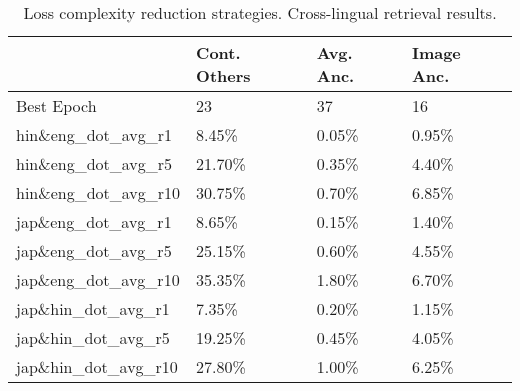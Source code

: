 \begin{table}
    \centering
\begin{tabular}{llll}
\toprule
{} & Cont. Others & Avg. Anc. & Image Anc. \\
\midrule
Best Epoch          &                            23 &                   37 &                           16 \\
\midrule
hin\&eng\_dot\_avg\_r1  &                         8.45\% &                0.05\% &                        0.95\% \\
hin\&eng\_dot\_avg\_r5  &                        21.70\% &                0.35\% &                        4.40\% \\
hin\&eng\_dot\_avg\_r10 &                        30.75\% &                0.70\% &                        6.85\% \\
\midrule
jap\&eng\_dot\_avg\_r1  &                         8.65\% &                0.15\% &                        1.40\% \\
jap\&eng\_dot\_avg\_r5  &                        25.15\% &                0.60\% &                        4.55\% \\
jap\&eng\_dot\_avg\_r10 &                        35.35\% &                1.80\% &                        6.70\% \\
\midrule
jap\&hin\_dot\_avg\_r1  &                         7.35\% &                0.20\% &                        1.15\% \\
jap\&hin\_dot\_avg\_r5  &                        19.25\% &                0.45\% &                        4.05\% \\
jap\&hin\_dot\_avg\_r10 &                        27.80\% &                1.00\% &                        6.25\% \\
\bottomrule
\end{tabular}
\caption{Loss complexity reduction strategies. Cross-lingual retrieval results.}
\label{table:complexity_opts_cling_ret}
\end{table}
